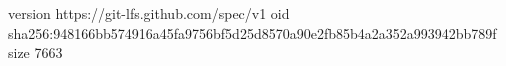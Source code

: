 version https://git-lfs.github.com/spec/v1
oid sha256:948166bb574916a45fa9756bf5d25d8570a90e2fb85b4a2a352a993942bb789f
size 7663
